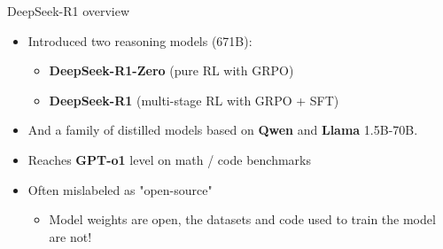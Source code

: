 \documentclass[9pt]{beamer}
\begin{document}
\begin{frame}{DeepSeek-R1 overview}
\begin{itemize}\setlength\itemsep{0.35em}
  \item Introduced two reasoning models (671B): 
 \begin{itemize}
      \vspace{1em}
     \item \textbf{DeepSeek-R1-Zero} (pure RL with GRPO)
      \vspace{1em}
     \item \textbf{DeepSeek-R1} (multi-stage RL with GRPO + SFT)
 \end{itemize} 
      \vspace{1em}
\item And a family of distilled models based on \textbf{Qwen} \cite{qwen2025qwen25technicalreport} and \textbf{Llama} \cite{touvron2023llamaopenefficientfoundation} 1.5B-70B.
  \vspace{1em}
\pause
    \item Reaches \textbf{GPT-o1} level on math / code benchmarks
  \vspace{1em}
  \item Often mislabeled as "open-source"
  \begin{itemize}
      \item Model weights are open, the datasets and code used to train the model are not!
  \end{itemize}
\end{itemize}

\end{frame}
\end{document}
